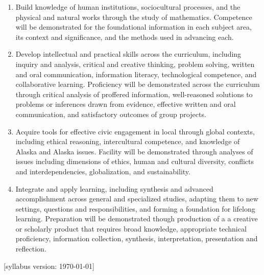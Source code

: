 \documentclass[12pt]{article}
\begin{document}
\begin{enumerate}
\item Build knowledge of human institutions, sociocultural processes, and the physical and natural works through the study of mathematics.  Competence will be demonstrated for the foundational information in each subject area, its context and significance, and the methods used in advancing each.

\item Develop intellectual and practical skills across the curriculum, including inquiry and analysis, critical and creative thinking, problem solving, written and oral communication, information literacy, technological competence, and collaborative learning. Proficiency will be demonstrated across the curriculum through critical analysis of proffered information, well-reasoned solutions to problems or inferences drawn from evidence, effective written and oral communication, and satisfactory outcomes of group projects.

\item Acquire tools for effective civic engagement in local through global contexts, including ethical reasoning, intercultural competence, and knowledge of Alaska and Alaska issues.  Facility will be demonstrated through analyses of issues including dimensions of ethics, human and cultural diversity, conflicts and interdependencies, globalization, and sustainability.   

\item Integrate and apply learning, including synthesis and advanced accomplishment across general and specialized studies, adapting them to new settings, questions and responsibilities, and forming a foundation for lifelong learning. Preparation will be demonstrated though production of a a creative or scholarly product that requires broad knowledge, appropriate technical proficiency, information collection, synthesis, interpretation, presentation and reflection.
\end{enumerate}

\hfill  \scriptsize [syllabus version: \today] \normalsize
\end{document}
